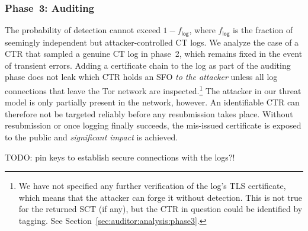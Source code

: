 \subsubsection{Phase~3: Auditing} \label{sec:analysis:pr:phase3}
The probability of detection cannot exceed $1-f_{\mathsf{log}}$, where
$f_{\mathsf{log}}$ is the fraction of seemingly independent but
attacker-controlled CT logs.  We analyze the case of a CTR that sampled a
genuine CT log in phase~2, which remains fixed in the event of transient errors.
Adding a certificate chain to the log as part of the auditing phase does not
leak which CTR holds an SFO \emph{to the attacker} unless all log connections
that leave the Tor network are inspected.\footnote{%
	We have not specified any further verification of the log's TLS certificate,
	which means that the attacker can forge it without detection.  This is not
	true for the returned SCT (if any), but the CTR in question could be
	identified by tagging.  See Section~\ref{sec:auditor:analysis:phase3}.
} The attacker in our threat model is only partially present in the network,
however.  An identifiable CTR can therefore not be targeted reliably before any
resubmission takes place.  Without resubmission or once logging finally
succeeds, the mis-issued certificate is exposed to the public and
\emph{significant impact} is achieved.

TODO: pin keys to establish secure connections with the logs?!
